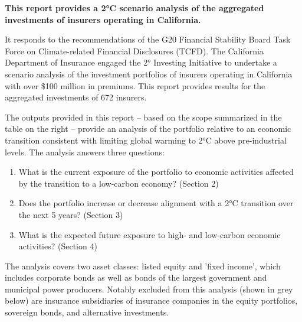 \documentclass[10pt,table,a4]{article}\usepackage[]{graphicx}\usepackage[]{color}
\begin{document}
	\begin{multicols}{2}
		\textbf{This report provides a 2°C scenario analysis of the aggregated investments of insurers operating in California.} 
		
		It responds to the recommendations of the G20 Financial Stability Board Task Force on Climate-related Financial Disclosures (TCFD). The California Department of Insurance engaged the 2° Investing Initiative to undertake a scenario analysis of the investment portfolios of insurers operating in California with over \$100 million in premiums. This report provides results for the aggregated investments of 672 insurers.

		The outputs provided in this report – based on the scope summarized in the table on the right – provide an analysis of the portfolio relative to an economic transition consistent with limiting global warming to 2°C above pre-industrial levels. The analysis answers three questions: 
		
		\begin{enumerate}
			\item{What is the current exposure of the portfolio to economic activities affected by the transition to a 	low-carbon economy? (Section 2)}
			\item{Does the portfolio increase or decrease alignment with a 2°C transition over the next 5 years? 	(Section 3)}
			\item{What is the expected future exposure to high- and low-carbon economic activities? (Section 4)}
		\end{enumerate}
		
		The analysis covers two asset classes: listed equity and 'fixed income', which includes corporate bonds as well as bonds of the largest government and municipal power producers. Notably excluded from this analysis (shown in grey below) are insurance subsidiaries of insurance companies in the equity portfolios, sovereign bonds, and alternative investments. 


\end{multicols}
\end{document}
